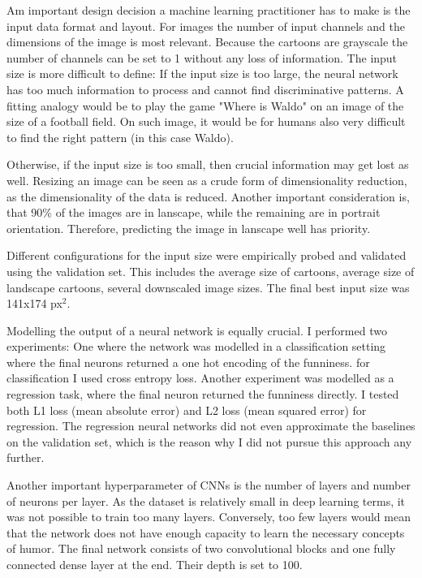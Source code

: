 \documentclass[draft,final,oneside]{vutinfth} %
\begin{document}
Am important design decision a machine learning practitioner has to make is the input data format and layout. For images the number of input channels and the dimensions of the image is most relevant. Because the cartoons are grayscale the number of channels can be set to 1 without any loss of information. The input size is more difficult to define: If the input size is too large, the neural network has too much information to process and cannot find discriminative patterns. A fitting analogy would be to play the game "Where is Waldo" on an image of the size of a football field. On such image, it would be for humans also very difficult to find the right pattern (in this case Waldo).

Otherwise, if the input size is too small, then crucial information may get lost as well. Resizing an image can be seen as a crude form of dimensionality reduction, as the dimensionality of the data is reduced. Another important consideration is, that 90\% of the images are in lanscape, while the remaining are in portrait orientation. Therefore, predicting the image in lanscape well has priority.

Different configurations for the input size were empirically probed and validated using the validation set. This includes the average size of cartoons, average size of landscape cartoons, several downscaled image sizes. The final best input size was 141x174 px$^2$.

Modelling the output of a neural network is equally crucial. I performed two experiments: One where the network was modelled in a classification setting where the final neurons returned a one hot encoding of the funniness. for classification I used cross entropy loss. Another experiment was modelled as a  regression task, where the final neuron returned the funniness directly. I tested both L1 loss (mean absolute error) and L2 loss (mean squared error) for regression. The regression neural networks did not even approximate the baselines on the validation set, which is the reason why I did not pursue this approach any further.

Another important hyperparameter of CNNs is the number of layers and number of neurons per layer. As the dataset is relatively small in deep learning terms, it was not possible to train too many layers. Conversely, too few layers would mean that the network does not have enough capacity to learn the necessary concepts of humor. The final network consists of two convolutional blocks and one fully connected dense layer at the end. Their depth is set to 100.
\end{document}
